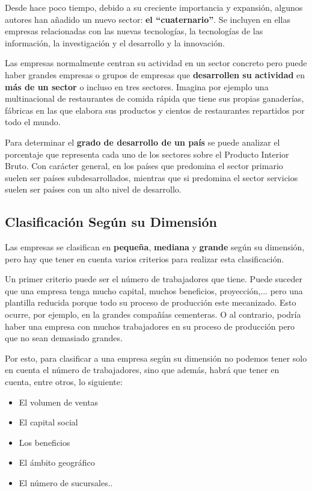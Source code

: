 Desde hace poco tiempo, debido a su creciente importancia y expansión, algunos autores han añadido un nuevo sector: \textbf{el ``cuaternario''}. Se incluyen en ellas empresas relacionadas con las nuevas tecnologías, la tecnologías de las información, la investigación y el desarrollo y la innovación.

Las empresas normalmente centran su actividad en un sector concreto pero puede haber grandes empresas o grupos de empresas que \textbf{desarrollen su actividad} en \textbf{más de un sector} o incluso en tres sectores. Imagina por ejemplo una multinacional de restaurantes de comida rápida que tiene sus propias ganaderías, fábricas en las que elabora sus productos y cientos de restaurantes repartidos por todo el mundo.

Para determinar el \textbf{grado de desarrollo de un país} se puede analizar el porcentaje que representa cada uno de los sectores sobre el Producto Interior Bruto. Con carácter general, en los países que predomina el sector primario suelen ser países subdesarrollados, mientras que si predomina el sector servicios suelen ser países con un alto nivel de desarrollo.

\subsection{Clasificación Según su Dimensión}
Las empresas se clasifican en  \textbf{pequeña}, \textbf{mediana} y \textbf{grande} según su dimensión, pero hay que tener en cuenta varios criterios para realizar esta clasificación.

Un primer criterio puede ser el número de trabajadores que tiene. Puede suceder que una empresa tenga mucho capital, muchos beneficios, proyección,... pero una plantilla reducida porque todo su proceso de producción este mecanizado. Esto ocurre, por ejemplo, en la grandes compañías cementeras. O al contrario, podría haber una empresa con muchos trabajadores en su proceso de producción pero que no sean demasiado grandes.

Por esto, para clasificar a una empresa según su dimensión no podemos tener solo en cuenta el número de trabajadores, sino que además, habrá que tener en cuenta, entre otros, lo siguiente:

\begin{itemize}
    \item El volumen de ventas
    \item El capital social
    \item Los beneficios
    \item El ámbito geográfico
    \item El número de sucursales..
\end{itemize}

